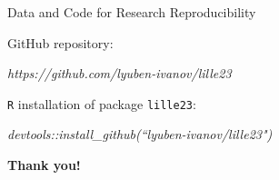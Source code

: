 \documentclass{beamer}
\begin{document}
\begin{frame}{Data and Code for Research Reproducibility}

GitHub repository: 

\quad \quad \textit{https://github.com/lyuben-ivanov/lille23}

\vfill

\texttt{R} installation of package \texttt{lille23}:

\quad \quad \textit{devtools::install\_github(``lyuben-ivanov/lille23")}

\end{frame}



\begin{frame}
\centering \Huge \bfseries Thank you!	
\end{frame}
\end{document}
